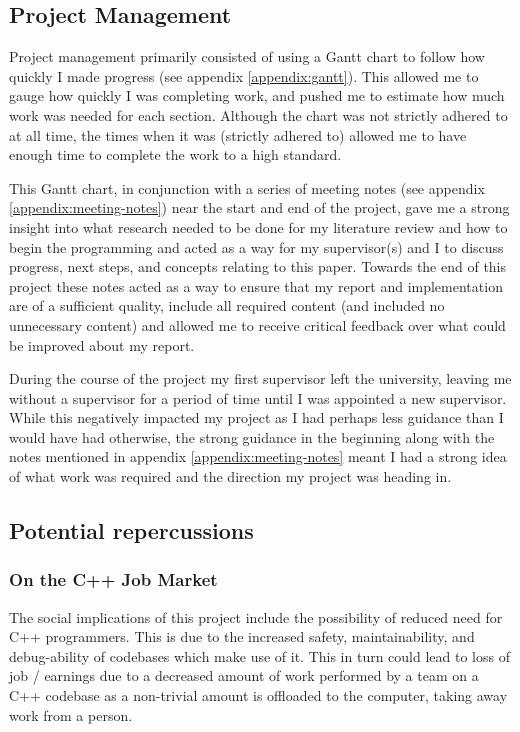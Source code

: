 \documentclass[a4paper]{article}
\begin{document}
    \subsection{Project Management}
    Project management primarily consisted of using a Gantt chart to follow how quickly I made progress (see appendix \ref{appendix:gantt}). This allowed me to gauge how quickly I was completing work, and pushed me to estimate how much work was needed for each section. Although the chart was not strictly adhered to at all time, the times when it was (strictly adhered to) allowed me to have enough time to complete the work to a high standard.

    This Gantt chart, in conjunction with a series of meeting notes (see appendix \ref{appendix:meeting-notes}) near the start and end of the project, gave me a strong insight into what research needed to be done for my literature review and how to begin the programming and acted as a way for my supervisor(s) and I to discuss progress, next steps, and concepts relating to this paper. Towards the end of this project these notes acted as a way to ensure that my report and implementation are of a sufficient quality, include all required content (and included no unnecessary content) and allowed me to receive critical feedback over what could be improved about my report.

    During the course of the project my first supervisor left the university, leaving me without a supervisor for a period of time until I was appointed a new supervisor. While this negatively impacted my project as I had perhaps less guidance than I would have had otherwise, the strong guidance in the beginning along with the notes mentioned in appendix \ref{appendix:meeting-notes} meant I had a strong idea of what work was required and the direction my project was heading in.
    \subsection{Potential repercussions}
    \subsubsection{On the C++ Job Market}
    The social implications of this project include the possibility of reduced need for C++ programmers. This is due to the increased safety, maintainability, and debug-ability of codebases which make use of it. This in turn could lead to loss of job / earnings due to a decreased amount of work performed by a team on a C++ codebase as a non-trivial amount is offloaded to the computer, taking away work from a person.
\end{document}
